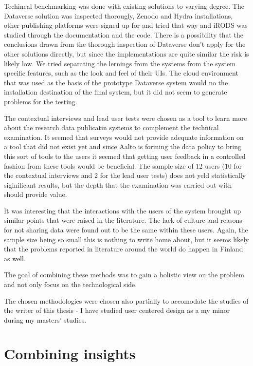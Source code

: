 Techincal benchmarking was done with existing solutions to varying degree.
The Dataverse solution was inspected thorougly, Zenodo and Hydra installations,
other publishing platforms were signed up for and tried that way and iRODS
was studied through the documentation and the code. There is a possibility
that the conclusions drawn from the thorough inspection of Dataverse don't
apply for the other solutions directly, but since the implementations are quite
similar the risk is likely low. We tried separating the lernings from the
systems from the system specific features, such as the look and feel of their
UIs. The cloud environment that was used as the basis of the prototype
Dataverse system would no the installation destination of the final system,
but it did not seem to generate problems for the testing.

The contextual interviews and lead user tests were chosen as a tool to learn
more about the research data publicatin systems to complement the technical
examination. It seemed that surveys would not provide adequate information on
a tool that did not exist yet and since Aalto is forming the data policy to
bring this sort of tools to the users it seemed that getting user feedback
in a controlled fashion from these tools would be beneficial. The sample size
of 12 users (10 for the contextual interviews and 2 for the lead user tests)
does not yeld statistically siginificant results, but the depth that the
examination was carried out with should provide value.

It was interesting that the interactions with the users of the system brought
up similar points that were raised in the literature. The lack of culture and
reasons for not sharing data were found out to be the same within these users.
Again, the sample size being so small this is nothing to write home about, but
it seems likely that the problems reported in literature around the world do
happen in Finland as well.

The goal of combining these methods was to gain a holistic view on the problem
and not only focus on the technological side.

The chosen methodologies were chosen also partially to accomodate the studies
of the writer of this thesis - I have studied user centered design as a my
minor during my masters' studies.

\section{Combining insights}

